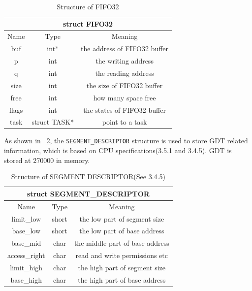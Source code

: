 \documentclass{swfcthesis}
\begin{document}
\begin{table}[!htbp]
  \centering
  \begin{tabular}[l]{|c|c|c|}
    \hline
    \multicolumn{3}{|c|}{struct FIFO32} \\
    \hline
    Name & Type & Meaning \\ \hline
    buf & int* & the address of FIFO32 buffer\\
    \hline
    p & int & the writing address \\
    \hline
    q & int & the reading address \\
    \hline
    size & int & the size of FIFO32 buffer \\
    \hline
    free & int & how many space free \\
    \hline
    flags & int & the states of FIFO32 buffer \\
    \hline
    task & struct TASK* & point to a task \\
    \hline
  \end{tabular}
  \caption{Structure of FIFO32}
  \label{tab:FIFO32}
\end{table}

As shown in ~\ref{tab:SEGMENT-DESCRIPTOR}, the \texttt{SEGMENT\_DESCRIPTOR} structure is
used to store GDT related information, which is based on CPU specifications(3.5.1 and
3.4.5\cite{intel_3a}). GDT is stored at 270000 in memory.

\begin{table}[!htbp]
  \centering
  \begin{tabular}[c]{|c|c|c|}
    \hline
    \multicolumn{3}{|c|}{struct SEGMENT\_DESCRIPTOR} \\
    \hline
    Name & Type & Meaning \\
    \hline
    limit\_low & short & the low part of segment size \\
    \hline
    base\_low & short & the low part of base address \\
    \hline
    base\_mid & char & the middle part of base address \\
    \hline
    access\_right & char & read and write permissions etc \\
    \hline
    limit\_high & char & the high part of segment size \\
    \hline
    base\_high & char & the high part of base address \\
    \hline
  \end{tabular}
  \caption{Structure of SEGMENT DESCRIPTOR(See 3.4.5\cite{intel_3a})}
  \label{tab:SEGMENT-DESCRIPTOR}
\end{table}
\end{document}
